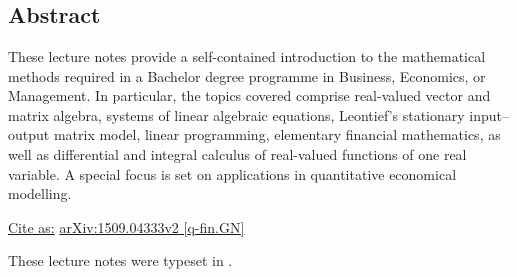 \chapter*{}
\vspace{-8ex}
\section*{Abstract}
{\small These lecture notes provide a self-contained introduction 
to the mathematical methods required in a Bachelor degree 
programme in Business, Economics, or Management. In particular, 
the topics covered comprise real-valued vector and matrix algebra, 
systems of linear algebraic equations, Leontief's stationary 
input--output matrix model, linear programming, elementary 
financial mathematics, as well as differential and integral 
calculus of real-valued functions of one real variable. A special 
focus is set on applications in quantitative economical modelling.}

\vspace{10mm}
\noindent
\underline{Cite as:} 
\href{http://arxiv.org/abs/1509.04333}{arXiv:1509.04333v2
[q-fin.GN]}
\vfill

\medskip
\noindent
These lecture notes were typeset in \LaTeXe.

